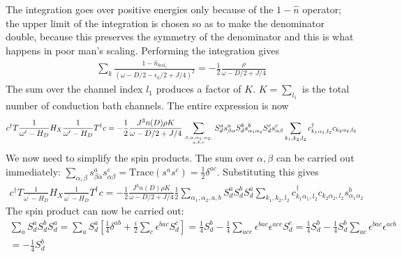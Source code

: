 The integration goes over positive energies only because of the \(1 - \hat n\) operator; the upper limit of the integration is chosen so as to make the denominator double, because this preserves the symmetry of the denominator and this is what happens in poor man's scaling. Performing the integration gives
\begin{equation}\begin{aligned}
	\sum_k \frac{1 - \hat n_{k\alpha l_1}}{\left(\omega - D/2 -\epsilon_k/2 + J/4\right)^2} = -\frac{1}{2}\frac{\rho}{\omega - D/2 + J/4}
\end{aligned}\end{equation}
The sum over the channel index \(l_1\) produces a factor of \(K\). \(K = \sum_{l_1}\) is the total number of conduction bath channels. The entire expression is now
\begin{equation}\begin{aligned}
	\label{first_term}
	c^\dagger T \frac{1}{\omega^\prime - H_D} H_X \frac{1}{\omega^\prime - H_D} T^\dagger c = -\frac{1}{2}\frac{J^3 n(D) \rho K}{\omega - D/2 + J/4}\sum_{\beta, \alpha, \alpha_1,\alpha_2,\atop{a,b,c}} S_d^a s^a_{\beta \alpha} S_d^b s^b_{\alpha_1 \alpha_2} S_d^c s^c_{\alpha \beta} \sum_{k_1,k_2,l_2} c^\dagger_{k_1\alpha_1,l_2}c_{k_2 \alpha_2,l_2}
\end{aligned}\end{equation}
We now need to simplify the spin products. The sum over \(\alpha,\beta\) can be carried out immediately: \(\sum_{\alpha,\beta} s^a_{\beta \alpha} s^c_{\alpha \beta} = \text{Trace}\left(s^a s^c\right) = \frac{1}{2}\delta^{ac}\). Substituting this gives
\begin{equation}\begin{aligned}
	c^\dagger T \frac{1}{\omega^\prime - H_D} H_X \frac{1}{\omega^\prime - H_D} T^\dagger c = -\frac{1}{2}\frac{J^3 n(D) \rho K}{\omega - D/2 + J/4}\frac{1}{2}\sum_{\alpha_1,\alpha_2,a,b} S_d^a S_d^b S_d^a \sum_{k_1,k_2,l_2} c^\dagger_{k_1\alpha_1,l_2}c_{k_2 \alpha_2,l_2}s^b_{\alpha_1 \alpha_2} 
\end{aligned}\end{equation}
The spin product can now be carried out:
\begin{equation}\begin{aligned}
	\sum_a S_d^a S_d^b S_d^a = \sum_a S_d^a\left[\frac{1}{4}\delta^{ab} + \frac{i}{2}\sum_c \epsilon^{bac}S_d^c\right] = \frac{1}{4}S_d^b - \frac{1}{4}\sum_{ace}\epsilon^{bac}\epsilon^{ace}S_d^e = \frac{1}{4}S_d^b - \frac{1}{4}S_d^b \sum_{ac}\epsilon^{bac}\epsilon^{acb} \\
	= -\frac{1}{4}S_d^b
\end{aligned}\end{equation}
